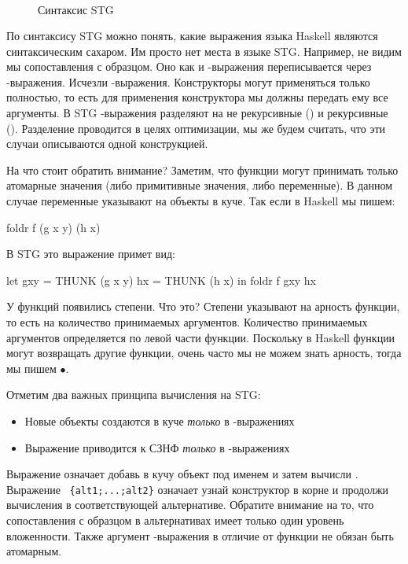 \begin{figure}[ht]
\[\begin{array}{rrlll}
\end{array}\]
\caption{Синтаксис STG}
\label{fig:SyntaxSTG}
\end{figure}

По синтаксису STG можно понять, какие выражения языка
Haskell являются синтаксическим сахаром. Им просто нет 
места в языке STG. Например, не видим мы сопоставления с образцом.
Оно как и -выражения переписывается через -выражения.
Исчезли -выражения. Конструкторы могут применяться
только полностью, то есть для применения конструктора мы должны
передать ему все аргументы. В STG -выражения
разделяют на не рекурсивные () и рекурсивные ().
Разделение проводится в целях оптимизации, мы же будем
считать, что эти случаи описываются одной конструкцией. 

На что стоит обратить внимание? Заметим, что функции
могут принимать только атомарные значения 
(либо примитивные значения, либо переменные). 
В данном случае переменные указывают на объекты в куче. 
Так если в Haskell мы пишем:

\begin{code}
foldr f (g x y) (h x)
\end{code}

В STG это выражение примет вид:

\begin{code}
let gxy = THUNK (g x y)
    hx  = THUNK (h x)
in  foldr f gxy hx
\end{code}

У функций появились степени. Что это? Степени указывают
на арность функции, то есть на количество принимаемых аргументов.
Количество принимаемых аргументов определяется по левой части
функции. Поскольку в Haskell функции могут возвращать другие функции,
очень часто мы не можем знать арность, тогда мы пишем $\bullet$.

Отметим два важных принципа вычисления на STG:

\begin{itemize}
\item Новые объекты создаются в куче \emph{только} в -выражениях
\item Выражение приводится к СЗНФ \emph{только} в -выражениях
\end{itemize}

Выражение  означает
добавь в кучу объект  под именем  и затем вычисли .
Выражение ~\verb!{alt1;...;alt2}! означает
узнай конструктор в корне  и продолжи вычисления в соответствующей
альтернативе. Обратите внимание на то, что сопоставления с образцом
в альтернативах имеет только один уровень вложенности. 
Также аргумент -выражения в отличие от функции не обязан
быть атомарным. 

